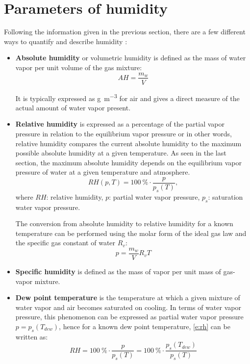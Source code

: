 \section{Parameters of humidity}
Following the information given in the previous section, there are a few different ways to quantify and describe humidity \autocite{greenPerryChemicalEngineers2019}:
\begin{itemize}
    \item \textbf{Absolute humidity} or volumetric humidity is defined as the mass of water vapor per unit volume of the gas mixture: 
    \begin{equation}
    AH = \frac{m_w}{V}
    \end{equation}
    
    It is typically expressed as \unit{g\per m^3} for air and gives a direct measure of the actual amount of water vapor present.
    \item  \textbf{Relative humidity} is expressed as a percentage of the partial vapor pressure in relation to the equilibrium vapor pressure or in other words, relative humidity compares the current absolute humidity to the maximum possible absolute humidity at a given temperature. As seen in the last section, the maximum absolute humidity depends on the equilibrium vapor pressure of water at a given temperature and atmosphere.
    \begin{equation}\label{e:rh}
    RH(p, T) = \qty{100}{\%} \cdot \frac{p}{p_s(T)},
    \end{equation}
    where $RH$: relative humidity, $p$: partial water vapor pressure, $p_s$: saturation water vapor pressure.

    The conversion from absolute humidity to relative humidity for a known temperature can be performed using the molar form of the ideal gas law and the specific gas constant of water $R_v$:
    \begin{equation}
    p = \frac{m_w}{V} R_v T
    \end{equation}
    \item \textbf{Specific humidity} is defined as the mass of vapor per unit mass of gas-vapor mixture.
    \item \textbf{Dew point temperature} is the temperature at which a given mixture of water vapor and air becomes saturated on cooling. In terms of water vapor pressure, this phenomenon can be expressed as partial water vapor pressure $p = p_s(T_{dew})$, hence for a known dew point temperature, \cref{e:rh} can be written as:
    \begin{equation}
    RH = \qty{100}{\%} \cdot \frac{p}{p_s(T)} = \qty{100}{\%} \cdot \frac{p_s(T_{dew})}{p_s(T)}
    \end{equation}
    
\end{itemize}


